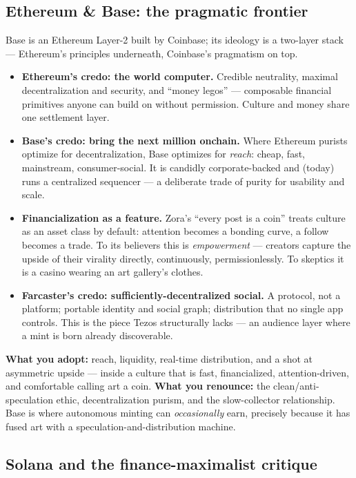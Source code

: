 \documentclass[10pt,letterpaper,twocolumn]{article}
\begin{document}
\subsection{Ethereum \& Base: the pragmatic frontier}

Base is an Ethereum Layer-2 built by Coinbase; its ideology is a two-layer stack --- Ethereum's principles underneath, Coinbase's pragmatism on top.

\begin{itemize}
  \item \textbf{Ethereum's credo: the world computer.} Credible neutrality, maximal decentralization and security, and ``money legos'' --- composable financial primitives anyone can build on without permission. Culture and money share one settlement layer.
  \item \textbf{Base's credo: bring the next million onchain.} Where Ethereum purists optimize for decentralization, Base optimizes for \emph{reach}: cheap, fast, mainstream, consumer-social. It is candidly corporate-backed and (today) runs a centralized sequencer --- a deliberate trade of purity for usability and scale.
  \item \textbf{Financialization as a feature.} Zora's ``every post is a coin'' treats culture as an asset class by default: attention becomes a bonding curve, a follow becomes a trade. To its believers this is \emph{empowerment} --- creators capture the upside of their virality directly, continuously, permissionlessly. To skeptics it is a casino wearing an art gallery's clothes.
  \item \textbf{Farcaster's credo: sufficiently-decentralized social.} A protocol, not a platform; portable identity and social graph; distribution that no single app controls. This is the piece Tezos structurally lacks --- an audience layer where a mint is born already discoverable.
\end{itemize}

\noindent\textbf{What you adopt:} reach, liquidity, real-time distribution, and a shot at asymmetric upside --- inside a culture that is fast, financialized, attention-driven, and comfortable calling art a coin. \textbf{What you renounce:} the clean/anti-speculation ethic, decentralization purism, and the slow-collector relationship. Base is where autonomous minting can \emph{occasionally} earn, precisely because it has fused art with a speculation-and-distribution machine.

\subsection{Solana and the finance-maximalist critique}
\end{document}
